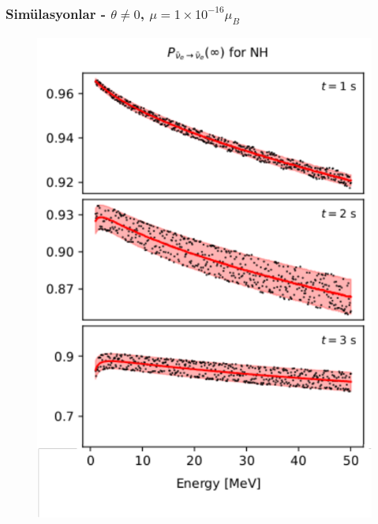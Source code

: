 \documentclass[10pt]{beamer}
\begin{document}
\begin{frame}
    \frametitle{Simülasyonlar - $\theta\ne0$, $\mu=1\times10^{-16}\mu_{B}$ }
    \begin{minipage}{0.45\textwidth}
        \begin{figure}[hbt!]
            \centering
            \includegraphics[width=\textwidth]{fig/6_1.pdf}
        \end{figure}
    \end{minipage}
    \hfill
    \begin{minipage}{0.45\textwidth}
        \begin{figure}[hbt!]
            \centering

\end{figure}
\end{minipage}
\end{frame}
\end{document}
